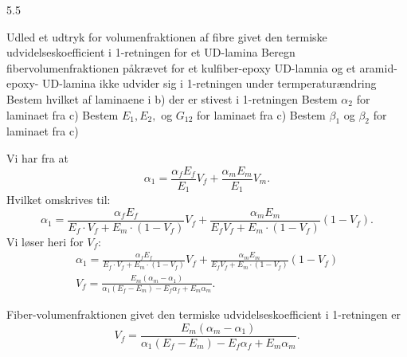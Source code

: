 \begin{problem}{5.5}
  \begin{subproblems}
    \subproblem Udled et udtryk for volumenfraktionen af fibre givet den termiske udvidelseskoefficient i 1-retningen for et UD-lamina
    \subproblem Beregn fibervolumenfraktionen påkrævet for et kulfiber-epoxy UD-lamnia og et aramid-epoxy- UD-lamina ikke udvider sig i 1-retningen under termperaturændring
    \subproblem Bestem hvilket af laminaene i b) der er stivest i 1-retningen
    \subproblem Bestem $\alpha_2$ for laminaet fra c)
    \subproblem Bestem $E_1, E_2,$ og $G_{12}$ for laminaet fra c)
    \subproblem Bestem $\beta_1$ og $\beta_2$ for laminaet fra c)
  \end{subproblems}
\end{problem}

\begin{derivation}
  \derivationpart
  Vi har fra \cite{jones2021mechanicscompositematerials} at
  \begin{equation*}
    \alpha_1 = \frac{\alpha_f E_f}{E_1} V_f + \frac{\alpha_m E_m}{E_1} V_m
  .\end{equation*}
  Hvilket omskrives til:
  \begin{equation*}
    \alpha_1 = \frac{\alpha_f E_f}{E_f \cdot V_f + E_m \cdot (1-V_f)} V_f + \frac{\alpha_m E_m}{E_f V_f + E_m \cdot (1-V_f)} (1-V_f)
  .\end{equation*}
  Vi løser heri for $V_f$:
  \begin{gather*}
    \alpha_1 = \frac{\alpha_f E_f}{E_f \cdot V_f + E_m \cdot (1-V_f)} V_f + \frac{\alpha_m E_m}{E_f V_f + E_m \cdot (1-V_f)} (1-V_f) \\ 
    V_f = \frac{E_m \left(\alpha _m-\alpha _1\right)}{\alpha _1 \left(E_f-E_m\right)-E_f \alpha _f + E_m \alpha _m}
  .\end{gather*}
  
  \begin{subresult}
    Fiber-volumenfraktionen givet den termiske udvidelseskoefficient i 1-retningen er
    \begin{equation*}
      V_f = \frac{E_m \left(\alpha _m-\alpha _1\right)}{\alpha _1 \left(E_f-E_m\right)-E_f \alpha _f + E_m \alpha _m}
    .\end{equation*}
  \end{subresult}

  \derivationpart


\end{derivation}
